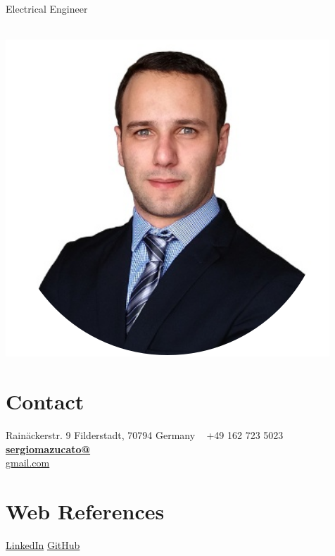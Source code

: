 \documentclass[]{friggeri-cv}
\begin{document}
      {Electrical Engineer \\ \\}
      

\begin{aside}
  \includegraphics[scale=0.32]{img/linkedin_.png}
  \section{Contact}
    Rainäckerstr. 9
    Filderstadt, 70794
    Germany
    ~
    +49 162 723 5023
    \href{mailto:sergiomazucato@gmail.com}{\textbf{sergiomazucato@}\\gmail.com}
    ~
  \section{Web References}
    \href{https://www.linkedin.com/in/sergiomazucato/}{LinkedIn}
    \href{https://github.com/sergiomazucato}{GitHub}
    ~

\end{aside}
\end{document}
